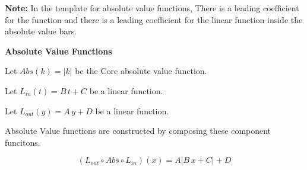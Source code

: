 \documentclass{ximera}
\begin{document}
\textbf{Note:}  In the template for absolute value functions, There is a leading coefficient for the function and there is a leading coefficient for the linear function inside the absolute value bars. 












\begin{idea} \textbf{\textcolor{blue!55!black}{Absolute Value Functions}}


Let $Abs(k) = |k| $ be the Core absolute value function.

Let $L_{in}(t) = B \, t + C$ be a linear function.

Let $L_{out}(y) = A \, y + D$ be a linear function.


Absolute Value functions are constructed by composing these component funcitons.


\[
(L_{out} \circ Abs \circ L_{in})(x) = A |B \,x + C| + D
\]




\end{idea}
\end{document}
